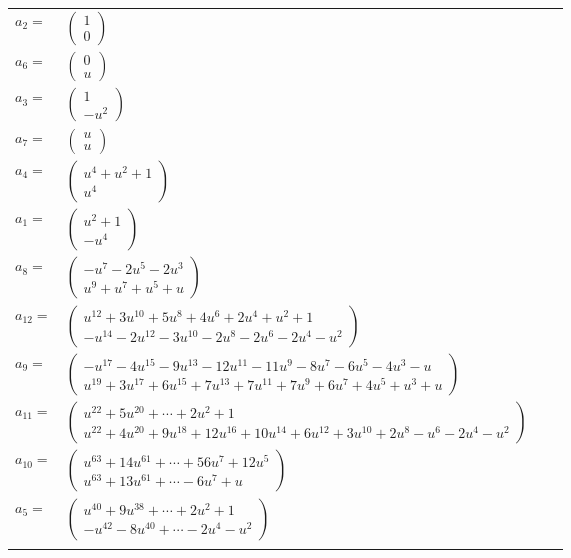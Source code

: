 \documentclass[1p]{elsarticle_modified}
\theoremstyle{definition}
\begin{document}
\begin{tabular}{m{7pt} m{180pt} m{7pt} m{180pt} }
\flushright $a_{2}=$&$\begin{pmatrix}1\\0\end{pmatrix}$ \\
\flushright $a_{6}=$&$\begin{pmatrix}0\\u\end{pmatrix}$ \\
\flushright $a_{3}=$&$\begin{pmatrix}1\\- u^2\end{pmatrix}$ \\
\flushright $a_{7}=$&$\begin{pmatrix}u\\u\end{pmatrix}$ \\
\flushright $a_{4}=$&$\begin{pmatrix}u^4+u^2+1\\u^4\end{pmatrix}$ \\
\flushright $a_{1}=$&$\begin{pmatrix}u^2+1\\- u^4\end{pmatrix}$ \\
\flushright $a_{8}=$&$\begin{pmatrix}- u^7-2 u^5-2 u^3\\u^9+u^7+u^5+u\end{pmatrix}$ \\
\flushright $a_{12}=$&$\begin{pmatrix}u^{12}+3 u^{10}+5 u^8+4 u^6+2 u^4+u^2+1\\- u^{14}-2 u^{12}-3 u^{10}-2 u^8-2 u^6-2 u^4- u^2\end{pmatrix}$ \\
\flushright $a_{9}=$&$\begin{pmatrix}- u^{17}-4 u^{15}-9 u^{13}-12 u^{11}-11 u^9-8 u^7-6 u^5-4 u^3- u\\u^{19}+3 u^{17}+6 u^{15}+7 u^{13}+7 u^{11}+7 u^9+6 u^7+4 u^5+u^3+u\end{pmatrix}$ \\
\flushright $a_{11}=$&$\begin{pmatrix}u^{22}+5 u^{20}+\cdots+2 u^2+1\\u^{22}+4 u^{20}+9 u^{18}+12 u^{16}+10 u^{14}+6 u^{12}+3 u^{10}+2 u^8- u^6-2 u^4- u^2\end{pmatrix}$ \\
\flushright $a_{10}=$&$\begin{pmatrix}u^{63}+14 u^{61}+\cdots+56 u^7+12 u^5\\u^{63}+13 u^{61}+\cdots-6 u^7+u\end{pmatrix}$ \\
\flushright $a_{5}=$&$\begin{pmatrix}u^{40}+9 u^{38}+\cdots+2 u^2+1\\- u^{42}-8 u^{40}+\cdots-2 u^4- u^2\end{pmatrix}$\\&\end{tabular}
\end{document}

